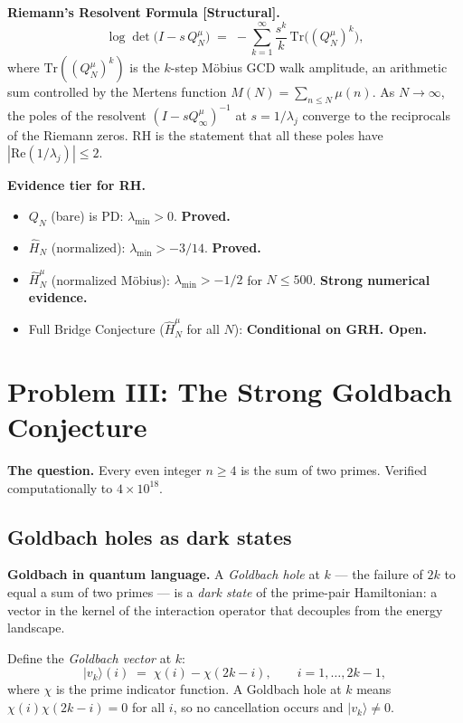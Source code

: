 \documentclass[12pt]{article}
\newcommand{\ket}[1]{|{#1}\rangle}
\begin{document}
\begin{tcolorbox}[keybox]
\textbf{Riemann's Resolvent Formula [Structural].}
\[
  \log \det\!\bigl(I - s\,Q_N^{\mu}\bigr)
  \;=\; -\sum_{k=1}^\infty \frac{s^k}{k}\,\mathrm{Tr}\bigl((Q_N^{\mu})^k\bigr),
\]
where $\mathrm{Tr}((Q_N^{\mu})^k)$ is the $k$-step M\"{o}bius GCD walk amplitude,
an arithmetic sum controlled by the Mertens function $M(N) = \sum_{n \le N}\mu(n)$.
As $N\to\infty$, the poles of the resolvent $(I - sQ_\infty^{\mu})^{-1}$ at $s = 1/\lambda_j$
converge to the reciprocals of the Riemann zeros.
RH is the statement that all these poles have $|\mathrm{Re}(1/\lambda_j)| \le 2$.
\end{tcolorbox}

\begin{tcolorbox}[warnbox]
\textbf{Evidence tier for RH.}
\begin{itemize}[itemsep=2pt]
  \item $Q_N$ (bare) is PD: $\lambda_{\min} > 0$. \textbf{Proved.}
  \item $\hat{H}_N$ (normalized): $\lambda_{\min} > -3/14$. \textbf{Proved.}
  \item $\hat{H}_N^{\mu}$ (normalized M\"{o}bius): $\lambda_{\min} > -1/2$ for $N \le 500$. \textbf{Strong numerical evidence.}
  \item Full Bridge Conjecture ($\hat{H}_N^{\mu}$ for all $N$): \textbf{Conditional on GRH. Open.}
\end{itemize}
\end{tcolorbox}

\section{Problem III: The Strong Goldbach Conjecture}
\label{sec:goldbach}

\textbf{The question.}
Every even integer $n \ge 4$ is the sum of two primes.
Verified computationally to $4\times10^{18}$.

\subsection{Goldbach holes as dark states}

\begin{tcolorbox}[goldbox]
\textbf{Goldbach in quantum language.}
A \emph{Goldbach hole} at $k$ --- the failure of $2k$ to equal a sum of
two primes --- is a \emph{dark state} of the prime-pair Hamiltonian:
a vector in the kernel of the interaction operator that decouples from
the energy landscape.

Define the \emph{Goldbach vector} at $k$:
\[
  \ket{v_k}(i) \;=\; \chi(i) - \chi(2k-i), \qquad i = 1,\ldots,2k-1,
\]
where $\chi$ is the prime indicator function.
A Goldbach hole at $k$ means $\chi(i)\chi(2k-i) = 0$ for all $i$,
so no cancellation occurs and $\ket{v_k} \ne 0$.
\end{tcolorbox}
\end{document}
